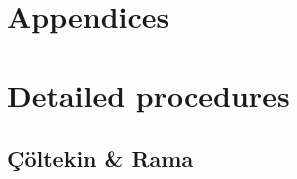 \documentclass[USenglish]{article}
\begin{document}







\newpage


\setcounter{section}{0}
\renewcommand\thesection{\Alph{section}}
\section*{Appendices}

\section{Detailed procedures}

\subsection{Çöltekin \& Rama}\label{sec:appendix_ccoltekin}
\end{document}
